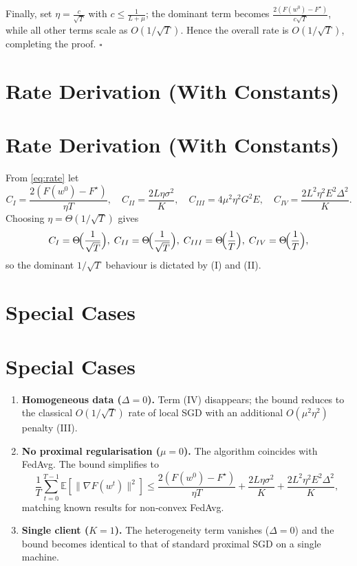 \documentclass{article}
\newcommand{\E}{\mathbb{E}}
\begin{document}
Finally, set $\eta = \frac{c}{\sqrt{T}}$ with $c\le \frac{1}{L+\mu}$;
the dominant term becomes $\frac{2(F(w^{0})-F^{\star})}{c\sqrt{T}}$,
while all other terms scale as $O(1/\sqrt{T})$.  Hence the overall rate is
$O(1/\sqrt{T})$, completing the proof. \hfill $\square$

\section*{Rate Derivation (With Constants)}
\section{Rate Derivation (With Constants)}
From \eqref{eq:rate} let
\[
C_{I}= \frac{2(F(w^{0})-F^{\star})}{\eta T},
\quad
C_{II}= \frac{2L\eta\sigma^{2}}{K},
\quad
C_{III}= 4\mu^{2}\eta^{2}G^{2}E,
\quad
C_{IV}= \frac{2L^{2}\eta^{2}E^{2}\Delta^{2}}{K}.
\]
Choosing $\eta = \Theta(1/\sqrt{T})$ gives
\[
C_{I}= \Theta\!\Bigl(\frac{1}{\sqrt{T}}\Bigr),\;
C_{II}= \Theta\!\Bigl(\frac{1}{\sqrt{T}}\Bigr),\;
C_{III}= \Theta\!\Bigl(\frac{1}{T}\Bigr),\;
C_{IV}= \Theta\!\Bigl(\frac{1}{T}\Bigr),
\]
so the dominant $1/\sqrt{T}$ behaviour is dictated by (I) and (II).

\section*{Special Cases}
\section{Special Cases}
\begin{enumerate}[label=\alph*)]
\item \textbf{Homogeneous data ($\Delta=0$).}
    Term (IV) disappears; the bound reduces to the classical
    $O(1/\sqrt{T})$ rate of local SGD with an additional $O(\mu^{2}\eta^{2})$
    penalty (III).

\item \textbf{No proximal regularisation ($\mu=0$).}
    The algorithm coincides with FedAvg.  The bound simplifies to
    \[
    \frac{1}{T}\sum_{t=0}^{T-1}\E[\|\nabla F(w^{t})\|^{2}]
    \le \frac{2(F(w^{0})-F^{\star})}{\eta T}
        + \frac{2L\eta\sigma^{2}}{K}
        + \frac{2L^{2}\eta^{2}E^{2}\Delta^{2}}{K},
    \]
    matching known results for non‑convex FedAvg.

\item \textbf{Single client ($K=1$).}
    The heterogeneity term vanishes ($\Delta=0$) and the bound becomes
    identical to that of standard proximal SGD on a single machine.
\end{enumerate}
\end{document}
